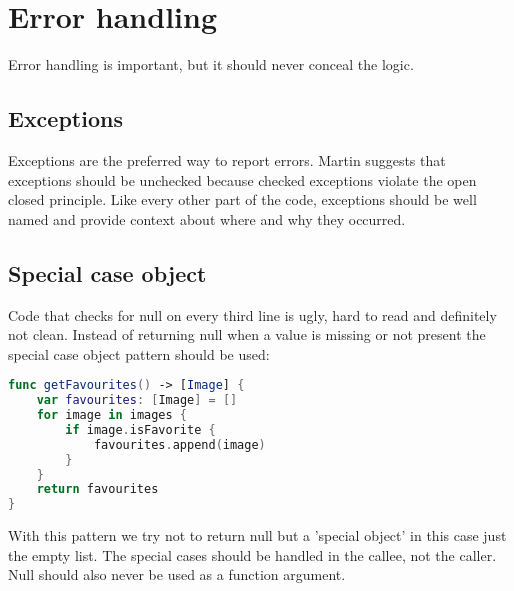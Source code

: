 \section{Error handling}
Error handling is important, but it should never conceal the logic.

\subsection{Exceptions}
Exceptions are the preferred way to report errors. Martin suggests that exceptions should be unchecked because checked exceptions violate the open closed principle. \cite{checked_exceptions}
Like every other part of the code, exceptions should be well named and provide context about where and why they occurred.

\subsection{Special case object}
Code that checks for null on every third line is ugly, hard to read and definitely not clean. Instead of returning null when a value is missing or not present the special case object pattern should be used:

\begin{lstlisting}[language=Swift, caption={Function that uses the special case object pattern}]
func getFavourites() -> [Image] {
    var favourites: [Image] = []
    for image in images {
        if image.isFavorite {
            favourites.append(image)
        }
    }
    return favourites
}
\end{lstlisting}

With this pattern we try not to return null but a 'special object' in this case just the empty list. The special cases should be handled in the callee, not the caller. Null should also never be used as a function argument.
